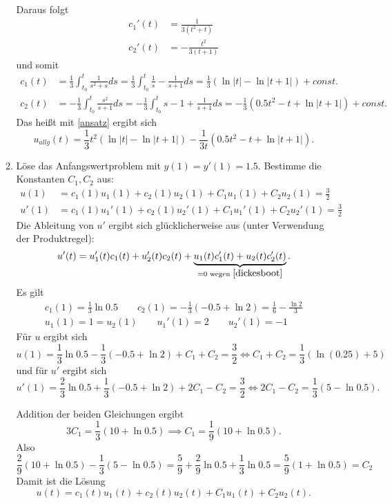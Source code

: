\documentclass[a4paper,fontsize=8pt,DIV=1]{article}
\theoremstyle{plain}
\begin{document}
\begin{enumerate}[label=(\alph*)]
\begin{enumerate}[label=\arabic*.)]
\[        \]
        Daraus folgt
        \begin{align*}
	        c_1'(t) &= \frac{1}{3(t^2+t)} \\
	        c_2'(t) &= -\frac{t^2}{3(t+1)}  
        \end{align*}
        und somit
        \begin{align*}
	        c_1(t) &= \frac{1}{3} \int^t_{t_0} \frac{1}{s^2+s}ds = \frac{1}{3} \int^t_{t_0} \frac{1}{s}-  \frac{1}{s+1}ds = \frac{1}{3}(\ln |t| - \ln|t+1|) + const. \\
	        c_2(t) &= -\frac{1}{3} \int^t_{t_0} \frac{s^2}{s+1}ds =  -\frac{1}{3} \int^t_{t_0} s-1 + \frac{1}{s+1}ds = -\frac{1}{3}(0.5t^2 - t + \ln|t+1|) + const.
        \end{align*}
        Das heißt mit \eqref{ansatz} ergibt sich
        \[
        	u_{allg}(t) = \frac{1}{3}t^2(\ln |t| - \ln|t+1|) - \frac{1}{3t}(0.5t^2 - t + \ln|t+1|).
        \]
        
        \item Löse das Anfangswertproblem mit $y(1) = y'(1) = 1.5$. Bestimme die Konstanten $C_1, C_2$ aus:
        \begin{align*}
        	u(1) &= c_1(1)u_1(1) + c_2(1) u_2(1)+ C_1u_1(1) + C_2u_2(1) = \frac{3}{2} \\
        	u'(1) &= c_1(1)u_1'(1) + c_2(1)u_2'(1) + C_1u_1'(1) + C_2u_2'(1)  = \frac{3}{2}
        \end{align*}
        Die Ableitung von $u'$ ergibt sich glücklicherweise aus (unter Verwendung der Produktregel):
        \[
       		u'(t) = u_1'(t)c_1(t) + u_2'(t)c_2(t) + \underbrace{u_1(t)c_1'(t) + u_2(t)c_2'(t)}_{=0 \text{ wegen }\eqref{dickesboot}}.
        \]
        Es gilt
        \begin{gather*}
        	c_1(1) = \frac{1}{3}\ln0.5 \qquad c_2(1) = -\frac{1}{3}(-0.5 + \ln2) = \frac{1}{6} - \frac{\ln2}{3} \\
        	u_1(1) = 1 = u_2(1) \qquad  u_1'(1) = 2 \qquad  u_2'(1) = -1
        \end{gather*}
        Für $u$ ergibt sich
        \[
        	u(1) = \frac{1}{3}\ln0.5 -\frac{1}{3}(-0.5 + \ln2) + C_1 + C_2 = \frac{3}{2} \iff C_1 + C_2 = \frac{1}{3}(\ln(0.25) + 5)
        \]
        und für $u'$ ergibt sich
        \[
        	u'(1) = \frac{2}{3}\ln0.5 +  \frac{1}{3}(-0.5 + \ln2) + 2C_1 - C_2 = \frac{3}{2} \iff 2C_1 - C_2 = \frac{1}{3}(5-\ln0.5).
        \]
        
        Addition der beiden Gleichungen ergibt
        \[
        	3C_1 = \frac{1}{3}(10 + \ln{0.5}) \implies C_1 = \frac{1}{9}(10 + \ln 0.5  ).
        \]
        Also 
        \[
        	\frac{2}{9}(10+\ln0.5) - \frac{1}{3}(5-\ln0.5) = \frac{5}{9} + \frac{2}{9}\ln0.5 + \frac{1}{3}\ln 0.5 =  \frac{5}{9}(1 + \ln 0.5) = C_2
        \]
        Damit ist die Lösung
        \[
        	u(t) = c_1(t)u_1(t) + c_2(t)u_2(t) + C_1u_1(t) + C_2u_2(t).
        \]
    \end{enumerate}
\end{enumerate}
\end{document}
